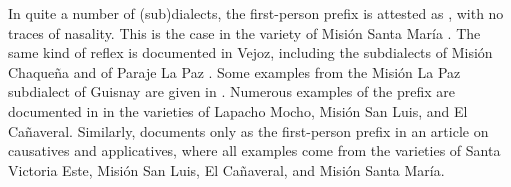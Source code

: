 In quite a number of (sub)dialects, the first-person prefix is attested as , with no traces of nasality. This is the case in the variety of Misión Santa María . The same kind of reflex is documented in Vejoz, including the subdialects of Misión Chaqueña \citep[131]{MG-MELO15,VU74} and of Paraje La Paz . Some examples from the Misión La Paz subdialect of Guisnay are given in . Numerous examples of the prefix  are documented in \citet[163–164, 167–168]{AFG-SS-09} in the varieties of Lapacho Mocho, Misión San Luis, and El Cañaveral. Similarly, \citet{SS15} documents only  as the first-person prefix in an article on causatives and applicatives, where all examples come from the varieties of Santa Victoria Este, Misión San Luis, El Cañaveral, and Misión Santa María.

